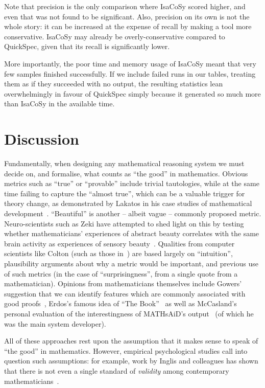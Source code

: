 Note that precision is the only comparison where IsaCoSy scored higher, and even
that was not found to be significant. Also, precision on its own is not the
whole story: it can be increased at the expense of recall by making a tool more
conservative. IsaCoSy may already be overly-conservative compared to QuickSpec,
given that its recall is significantly lower.

More importantly, the poor time and memory usage of IsaCoSy meant that very few
samples finished successfully. If we include failed runs in our tables, treating
them as if they succeeded with no output, the resulting statistics lean
overwhelmingly in favour of QuickSpec simply because it generated so much more
than IsaCoSy in the available time.

\section{Discussion}
\label{sec:discussion}

Fundamentally, when designing any mathematical reasoning system we must decide
on, and formalise, what counts as ``the good'' in mathematics.  Obvious metrics
such as ``true'' or ``provable'' include trivial tautologies, while at the same
time failing to capture the ``almost true'', which can be a valuable trigger for
theory change, as demonstrated by Lakatos in his case studies of mathematical
development~\cite{lakatos}. ``Beautiful'' is another -- albeit vague -- commonly
proposed metric. Neuro-scientists such as Zeki \etal{} have attempted to shed
light on this by testing whether mathematicians' experiences of abstract beauty
correlates with the same brain activity as experiences of sensory
beauty~\cite{10.3389/fnhum.2014.00068}. Qualities from computer scientists like
Colton (such as those in~\cite{colton2000notion}) are based largely on
``intuition'', plausibility arguments about why a metric would be important, and
previous use of such metrics (in the case of ``surprisingness'', from a single
quote from a mathematician). Opinions from mathematicians themselves include
Gowers' suggestion that we can identify features which are commonly associated
with good proofs~\cite{gowers2000two}, Erdos's famous idea of ``The
Book''~\cite{aigner2010proofs} as well as McCasland's personal evaluation of the
interestingness of MATHsAiD's output~\cite{roy} (of which he was the main system
developer).

All of these approaches rest upon the assumption that it makes sense to speak of
``the good'' in mathematics. However, empirical psychological studies
call into question such assumptions: for example, work by Inglis and colleagues
has shown that there is not even a single standard of \emph{validity} among
contemporary mathematicians~\cite{inglis2013mathematicians}.

